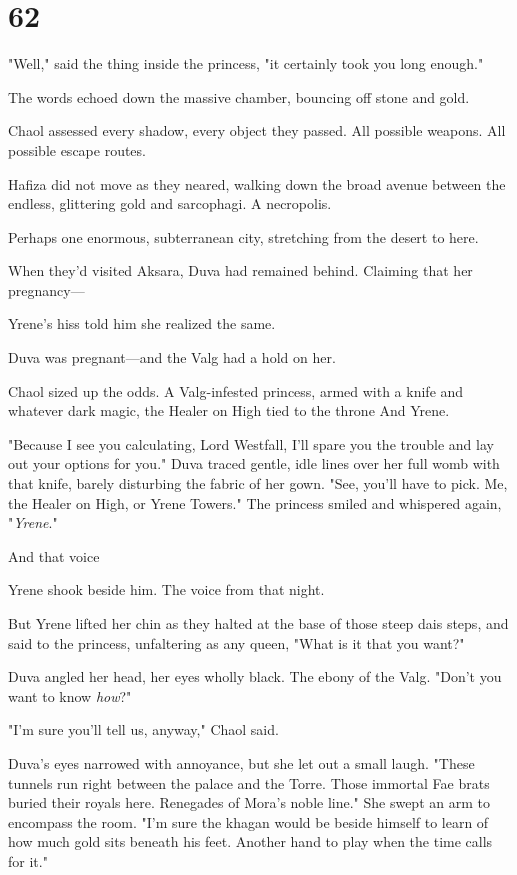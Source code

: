
\chapter{62}

"Well," said the thing inside the princess, "it certainly took you long enough."

The words echoed down the massive chamber, bouncing off stone and gold.

Chaol assessed every shadow, every object they passed.
All possible weapons.
All possible escape routes.

Hafiza did not move as they neared, walking down the broad avenue between the endless, glittering gold and sarcophagi.
A necropolis.

Perhaps one enormous, subterranean city, stretching from the desert to here.

When they'd visited Aksara, Duva had remained behind.
Claiming that her pregnancy---

Yrene's hiss told him she realized the same.

Duva was pregnant---and the Valg had a hold on her.

Chaol sized up the odds.
A Valg-infested princess, armed with a knife and whatever dark magic, the Healer on High tied to the throne 
And Yrene.

"Because I see you calculating, Lord Westfall, I'll spare you the trouble and lay out your options for you."
Duva traced gentle, idle lines over her full womb with that knife, barely disturbing the fabric of her gown.
"See, you'll have to pick.
Me, the Healer on High, or Yrene Towers."
The princess smiled and whispered again, "\emph{Yrene}."

And that voice 

Yrene shook beside him.
The voice from that night.

But Yrene lifted her chin as they halted at the base of those steep dais steps, and said to the princess, unfaltering as any queen, "What is it that you want?"

Duva angled her head, her eyes wholly black.
The ebony of the Valg.
"Don't you want to know \emph{how}?"

"I'm sure you'll tell us, anyway," Chaol said.

Duva's eyes narrowed with annoyance, but she let out a small laugh.
"These tunnels run right between the palace and the Torre.
Those immortal Fae brats buried their royals here.
Renegades of Mora's noble line."
She swept an arm to encompass the room.
"I'm sure the khagan would be beside himself to learn of how much gold sits beneath his feet.
Another hand to play when the time calls for it."

